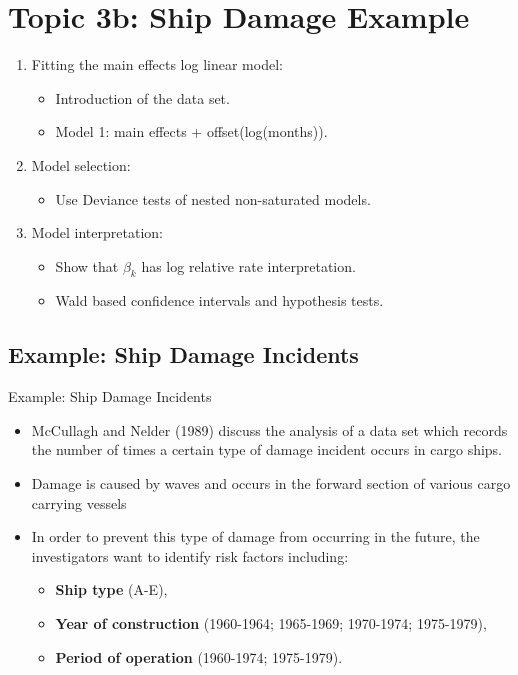\documentclass[oneside]{book}\usepackage[]{graphicx}\usepackage[svgnames]{xcolor}
\begin{document}
\section*{Topic 3b: Ship Damage Example}
\begin{enumerate}[1.]
      \item Fitting the main effects log linear model:
            \begin{itemize}
                  \item Introduction of the data set.
                  \item Model 1: main effects + offset(log(months)).
            \end{itemize}
      \item Model selection:
            \begin{itemize}
                  \item Use Deviance tests of nested non-saturated models.
            \end{itemize}
      \item Model interpretation:
            \begin{itemize}
                  \item Show that $ \beta_k $ has log relative rate interpretation.
                  \item Wald based confidence intervals and hypothesis tests.
            \end{itemize}
\end{enumerate}
\subsection*{Example: Ship Damage Incidents}
\begin{Example}{Example: Ship Damage Incidents}
      \begin{itemize}
            \item McCullagh and Nelder (1989) discuss the analysis of a data set which records the
                  number of times a certain type of damage incident occurs in cargo ships.
            \item Damage is caused by waves and occurs in the forward section of various cargo
                  carrying vessels
            \item In order to prevent this type of damage from occurring in the future, the
                  investigators want to identify risk factors including:
                  \begin{itemize}
                        \item \textbf{Ship type} (A-E),
                        \item \textbf{Year of construction} (1960-1964; 1965-1969; 1970-1974; 1975-1979),
                        \item \textbf{Period of operation} (1960-1974; 1975-1979).
                  \end{itemize}
      \end{itemize}
\end{Example}
\end{document}
